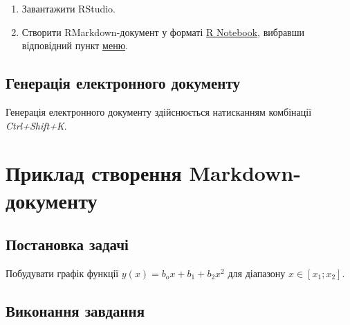 \documentclass[
]{book}
\begin{document}
\begin{enumerate}
\def\labelenumi{\arabic{enumi}.}
\item
  Завантажити RStudio.
\item
  Створити RMarkdown-документ у форматі \href{http://rmarkdown.rstudio.com/r_notebooks.html}{R Notebook}, вибравши відповідний пункт \href{https://prnt.sc/gkpes4}{меню}.
\end{enumerate}

\hypertarget{ux433ux435ux43dux435ux440ux430ux446ux456ux44f-ux435ux43bux435ux43aux442ux440ux43eux43dux43dux43eux433ux43e-ux434ux43eux43aux443ux43cux435ux43dux442ux443}{%
\subsection{Генерація електронного документу}\label{ux433ux435ux43dux435ux440ux430ux446ux456ux44f-ux435ux43bux435ux43aux442ux440ux43eux43dux43dux43eux433ux43e-ux434ux43eux43aux443ux43cux435ux43dux442ux443}}

Генерація електронного документу здійснюється натисканням комбінації \emph{Ctrl+Shift+K}.

\hypertarget{ux43fux440ux438ux43aux43bux430ux434-ux441ux442ux432ux43eux440ux435ux43dux43dux44f-markdown-ux434ux43eux43aux443ux43cux435ux43dux442ux443}{%
\section{Приклад створення Markdown-документу}\label{ux43fux440ux438ux43aux43bux430ux434-ux441ux442ux432ux43eux440ux435ux43dux43dux44f-markdown-ux434ux43eux43aux443ux43cux435ux43dux442ux443}}

\hypertarget{ux43fux43eux441ux442ux430ux43dux43eux432ux43aux430-ux437ux430ux434ux430ux447ux456}{%
\subsection{Постановка задачі}\label{ux43fux43eux441ux442ux430ux43dux43eux432ux43aux430-ux437ux430ux434ux430ux447ux456}}

Побудувати графік функції \(y(x)=b_ox+b_1+b_2x^2\) для діапазону \(x \in [x_1;x_2]\).

\hypertarget{ux432ux438ux43aux43eux43dux430ux43dux43dux44f-ux437ux430ux432ux434ux430ux43dux43dux44f}{%
\subsection{Виконання завдання}\label{ux432ux438ux43aux43eux43dux430ux43dux43dux44f-ux437ux430ux432ux434ux430ux43dux43dux44f}}
\end{document}
